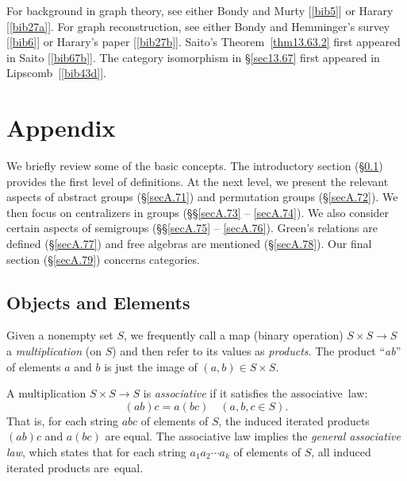 \documentclass{surv-l}
\numberwithin{equation}{section}
\numberwithin{table}{section}
\numberwithin{figure}{section}
\theoremstyle{plain}
\theoremstyle{definition}
\begin{document}
For background in graph theory, see either Bondy and
Murty [\ref{bib5}] or
Harary [\ref{bib27a}]. For
graph reconstruction, see either Bondy and
Hemminger's survey
[\ref{bib6}] or Harary's paper
[\ref{bib27b}]. Saito's
Theorem~\ref{thm13.63.2} first appeared in
Saito [\ref{bib67b}]. The
category isomorphism in \S\ref{sec13.67} first appeared in
Lipscomb~[\ref{bib43d}].


\chapter*{Appendix}\label{chapA}

We briefly review some of the basic concepts. The introductory
section (\S\ref{secA.70}) provides the first level of
definitions. At the next level, we present the relevant
aspects of abstract groups (\S\ref{secA.71}) and permutation
groups (\S\ref{secA.72}). We then focus on centralizers in
groups (\S\S\ref{secA.73} -- \ref{secA.74}). We also consider
certain aspects of semigroups (\S\S\ref{secA.75} --
\ref{secA.76}). Green's relations are defined
(\S\ref{secA.77}) and free algebras are mentioned
(\S\ref{secA.78}). Our final section (\S\ref{secA.79})
concerns categories.

\setcounter{section}{69}

\section{Objects and Elements}\label{secA.70}

Given a nonempty set $S$, we frequently call a map (binary
operation) $S\times S \rightarrow S$ a
\emph{multiplication} (on $S$) and then
refer to its values as \emph{products}. The
product ``\emph{ab}'' of elements $a$ and $b$ is just the image of
$(a, b)\in S\times S$.

A multiplication $S\times S\rightarrow S$ is
\emph{associative} if it
satisfies the associative~law:
\[
(ab)c=a(bc)\quad (a,b, c\in S).
\]
That is, for each string $abc$ of elements of $S$, the induced
iterated products $(ab)c$ and $a(bc)$ are equal. The associative
law implies the \emph{general associative law}, which states that for each string
$a_{1}a_{2}\cdots a_{k}$ of elements of $S$, all induced iterated
products are~equal.
\end{document}
